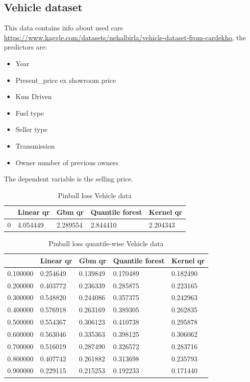 \subsection{Vehicle dataset}
This data contains info about used cars \href{https://www.kaggle.com/datasets/nehalbirla/vehicle-dataset-from-cardekho}{https://www.kaggle.com/datasets/nehalbirla/vehicle-dataset-from-cardekho}, the predictors are:
\begin{itemize}
    \item Year
    \item Present\_price ex showroom price
    \item Kms Driven
    \item Fuel type
    \item Seller type
    \item Transmission
    \item Owner number of previous owners
\end{itemize}
The dependent variable is the selling price.

\begin{table}
\caption{Pinball loss Vehicle data}
\begin{tabular}{lllll}
    \toprule
     & Linear qr & Gbm qr & Quantile forest & Kernel qr \\
    \midrule
    0 & 4.054449 & 2.289554 & 2.844410 & 2.204343 \\
    \bottomrule
    \end{tabular}
\end{table}

\begin{table}
    \caption{Pinball loss quantile-wise Vehicle data}
    \begin{tabular}{lllll}
    \toprule
     & Linear qr & Gbm qr & Quantile forest & Kernel qr \\
    \midrule
    0.100000 & 0.254649 & 0.139849 & 0.170489 & 0.182490 \\
    0.200000 & 0.403772 & 0.236339 & 0.285875 & 0.223165 \\
    0.300000 & 0.548820 & 0.244086 & 0.357375 & 0.242963 \\
    0.400000 & 0.576918 & 0.263169 & 0.389305 & 0.262835 \\
    0.500000 & 0.554367 & 0.306123 & 0.410738 & 0.295878 \\
    0.600000 & 0.563046 & 0.335363 & 0.398125 & 0.306062 \\
    0.700000 & 0.516019 & 0.287490 & 0.326572 & 0.283716 \\
    0.800000 & 0.407742 & 0.261882 & 0.313698 & 0.235793 \\
    0.900000 & 0.229115 & 0.215253 & 0.192233 & 0.171440 \\
    \bottomrule
    \end{tabular}
\end{table}

